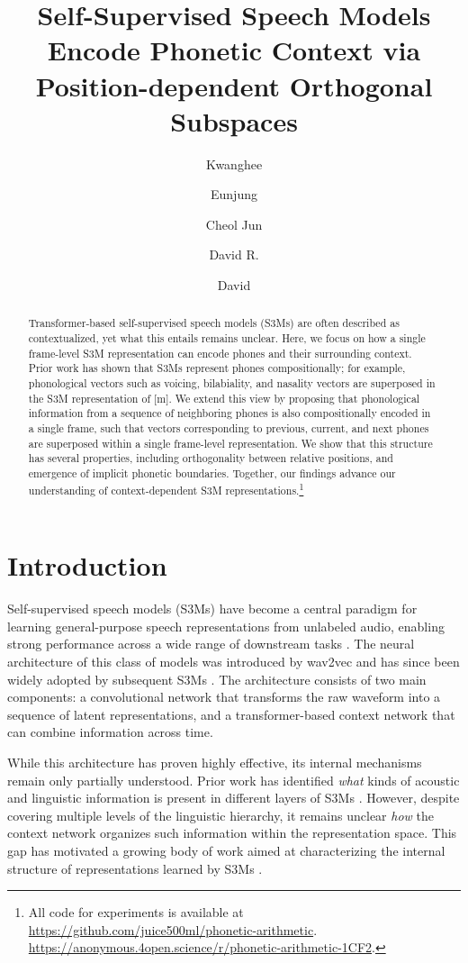 \documentclass[cameraready]{Interspeech}
\title{Self-Supervised Speech Models Encode Phonetic Context via Position-dependent Orthogonal Subspaces}
\author[affiliation={1}]{Kwanghee}{Choi}
\author[affiliation={1}]{Eunjung}{Yeo}
\author[affiliation={2}]{Cheol Jun}{Cho}
\author[affiliation={3}]{David R.}{Mortensen}
\author[affiliation={1}]{David}{Harwath}
\begin{document}
\maketitle

\begin{abstract}
Transformer-based self-supervised speech models (S3Ms) are often described as contextualized, yet what this entails remains unclear.
Here, we focus on how a single frame-level S3M representation can encode phones and their surrounding context.
Prior work has shown that S3Ms represent phones compositionally; for example, phonological vectors such as voicing, bilabiality, and nasality vectors are superposed in the S3M representation of [m].
We extend this view by proposing that phonological information from a sequence of neighboring phones is also compositionally encoded in a single frame, such that vectors corresponding to previous, current, and next phones are superposed within a single frame-level representation.
We show that this structure has several properties, including orthogonality between relative positions, and emergence of implicit phonetic boundaries.
Together, our findings advance our understanding of context-dependent S3M representations.\footnote{All code for experiments is available at 
\ifcameraready
\url{https://github.com/juice500ml/phonetic-arithmetic}.
\else
\url{https://anonymous.4open.science/r/phonetic-arithmetic-1CF2}.
\fi
}
\end{abstract}


\section{Introduction}
Self-supervised speech models (S3Ms) have become a central paradigm for learning general-purpose speech representations from unlabeled audio, enabling strong performance across a wide range of downstream tasks \cite{baevski2020wav2vec,hsu2021hubert,chen2022wavlm}.
The neural architecture of this class of models was introduced by wav2vec \cite{schneider2019wav2vec} and has since been widely adopted by subsequent S3Ms \cite{baevski2020wav2vec,hsu2021hubert,chen2022wavlm}.
The architecture consists of two main components: a convolutional network that transforms the raw waveform into a sequence of latent representations, and a transformer-based context network that can combine information across time.


While this architecture has proven highly effective, its internal mechanisms remain only partially understood.
Prior work has identified \textit{what} kinds of acoustic and linguistic information is present in different layers of S3Ms \cite{pasad2021layer,pasad2023comparative}.
However, despite covering multiple levels of the linguistic hierarchy, it remains unclear \textit{how} the context network organizes such information within the representation space.
This gap has motivated a growing body of work aimed at characterizing the internal structure of representations learned by S3Ms \cite{liu2023self,meng25b_interspeech,choi2022opening,choi2024self,choi2026self,choi2025leveraging,sicherman2023analysing,wells22_interspeech}.
\end{document}
